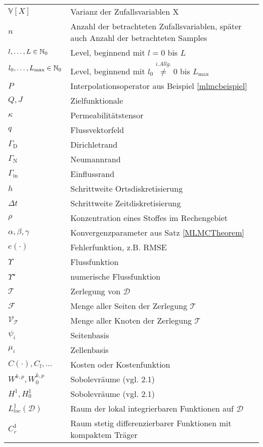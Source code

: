 \begin{longtable}[c]{ p{} p{}}
	$ \mathbb{V}[X] $ & Varianz der Zufallsvariablen X \\
	$ n $ & Anzahl der betrachteten Zufallsvariablen, später auch Anzahl der betrachteten Samples \\
	$ l,\dots,L \in \mathbb{N}_0$ & Level, beginnend mit $ l=0 $ bis $ L $ \\
	$ l_0, \dots , L_{\text{max}} \in \mathbb{N}_0 $ & Level, beginnend mit $ l_0 \stackrel{i.Allg.}{\not =} 0 $ bis $ L_{\text{max}} $  \\
	$ P $ & Interpolationsoperator aus Beispiel \ref{mlmcbeispiel} \\
	$ Q,J $ & Zielfunktionale \\
	$ \kappa $ & Permeabilitätstensor \\
	$ q $ & Flussvektorfeld \\
	$ \Gamma_{\text{D}} $ & Dirichletrand \\
	$ \Gamma_{\text{N}} $ & Neumannrand \\
	$ \Gamma_{\text{in}} $ & Einflussrand \\
	$ h $ & Schrittweite Ortsdiskretisierung \\
	$ \Delta t $ & Schrittweite Zeitdiskretisierung \\
	$ \rho $ & Konzentration eines Stoffes im Rechengebiet \\
	$ \alpha,\beta,\gamma $ & Konvergenzparameter aus Satz \ref{MLMCTheorem} \\
	$ e(\cdot) $ & Fehlerfunktion, z.B. RMSE \\
	$ \Upsilon $ & Flussfunktion \\
	$ \Upsilon^{\star} $ & numerische Flussfunktion \\
	$ \mathcal{T} $ & Zerlegung von $ \mathcal{D} $ \\
	$ \mathcal{F} $ & Menge aller Seiten der Zerlegung $ \mathcal{T} $ \\
	$ \mathcal{V}_{\mathcal{T}} $ & Menge aller Knoten der Zerlegung $ \mathcal{T} $\\
	$ {\psi_i} $ & Seitenbasis \\
	$ {\mu_i} $ & Zellenbasis \\
	$ C(\cdot) , C_l , \dots $ & Kosten oder Kostenfunktion \\
	$ W^{k,p},W_0^{k,p} $ & Sobolevräume (vgl. 2.1) \\
	$ H^1,H_0^1$ & Sobolevräume (vgl. 2.1) \\
	$ L^1_{loc}(\mathcal{ D}) $ & Raum der lokal integrierbaren Funktionen auf $ \mathcal{ D} $ \\
	$ C_c^{1} $ & Raum stetig differenzierbarer Funktionen mit kompaktem  Träger \\

\end{longtable}
